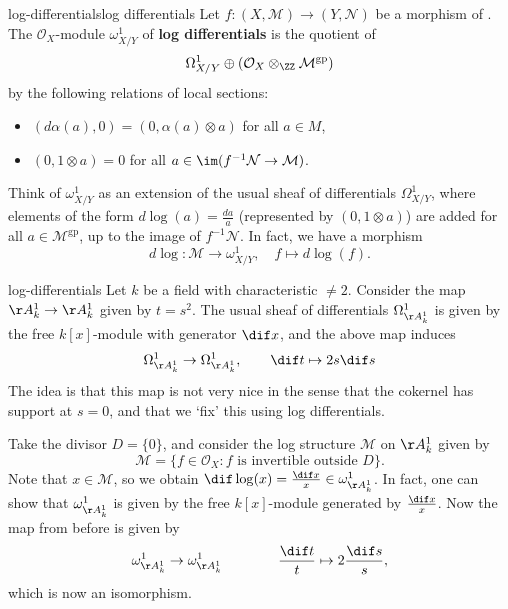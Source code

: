 \begin{topic}{log-differentials}{log differentials}
    Let $f : (X, \mathcal{M}) \to (Y, \mathcal{N})$ be a morphism of . The $\mathcal{O}_X$-module $\omega^1_{X/Y}$ of \textbf{log differentials} is the quotient of
    \[ \Omega_{X/Y}^1 \oplus (\mathcal{O}_X \otimes_\ZZ \mathcal{M}^\text{gp}) \]
    by the following relations of local sections:
    \begin{itemize}
        \item $(d \alpha(a), 0) = (0, \alpha(a) \otimes a)$ for all $a \in M$,
        \item $(0, 1 \otimes a) = 0$ for all $a \in \im(f^{-1} \mathcal{N} \to \mathcal{M})$.
    \end{itemize}
    
    Think of $\omega^1_{X/Y}$ as an extension of the usual sheaf of differentials $\Omega_{X/Y}^1$, where elements of the form $d \log(a) = \frac{da}{a}$ (represented by $(0, 1 \otimes a)$) are added for all $a \in \mathcal{M}^\text{gp}$, up to the image of $f^{-1} \mathcal{N}$. In fact, we have a morphism
    \[ d \log : \mathcal{M} \to \omega_{X/Y}^1, \quad f \mapsto d \log(f) . \]
\end{topic}

\begin{example}{log-differentials}
    Let $k$ be a field with characteristic $\ne 2$. Consider the map $\AA^1_k \to \AA^1_k$ given by $t = s^2$. The usual sheaf of differentials $\Omega^1_{\AA^1_k}$ is given by the free $k[x]$-module with generator $\dif x$, and the above map induces
    \[ \Omega^1_{\AA^1_k} \to \Omega^1_{\AA^1_k}, \qquad \dif t \mapsto 2 s \dif s \]
    The idea is that this map is not very nice in the sense that the cokernel has support at $s = 0$, and that we `fix' this using log differentials.
    
    Take the divisor $D = \{ 0 \}$, and consider the log structure $\mathcal{M}$ on $\AA^1_k$ given by
    \[ \mathcal{M} = \{ f \in \mathcal{O}_X : f \text{ is invertible outside } D \} . \]
    Note that $x \in \mathcal{M}$, so we obtain $\dif \log(x) = \frac{\dif x}{x} \in \omega^1_{\AA^1_k}$. In fact, one can show that $\omega^1_{\AA^1_k}$ is given by the free $k[x]$-module generated by $\frac{\dif x}{x}$. Now the map from before is given by
    \[ \omega^1_{\AA^1_k} \to \omega^1_{\AA^1_k} \qquad  \qquad \frac{\dif t}{t} \mapsto 2 \frac{\dif s} s , \]
    which is now an isomorphism.
\end{example}
